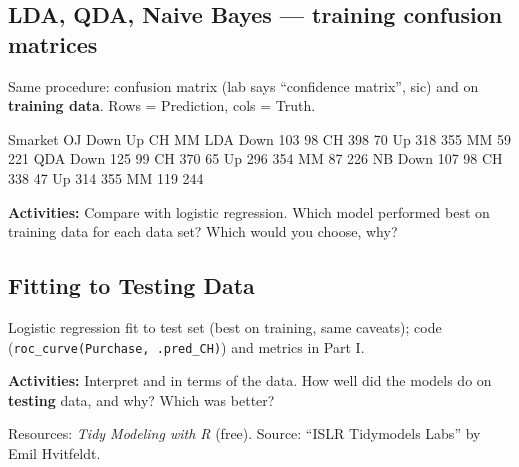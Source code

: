 \subsection{LDA, QDA, Naive Bayes --- training confusion matrices}
%
Same procedure: confusion matrix (lab says ``confidence matrix'', sic) and  on \textbf{training data}. Rows = Prediction, cols = Truth.
\begin{routput}
              Smarket          OJ
            Down   Up       CH   MM
LDA   Down   103   98   CH 398   70
      Up     318  355   MM  59  221
QDA   Down   125   99   CH 370   65
      Up     296  354   MM  87  226
NB    Down   107   98   CH 338   47
      Up     314  355   MM 119  244
\end{routput}
\textbf{Activities:} Compare  with logistic regression. Which model performed best on training data for each data set? Which would you choose, why?

\subsection{Fitting to Testing Data}
%
Logistic regression fit to  test set (best on training, same caveats); code (\texttt{roc\_curve(Purchase, .pred\_CH)}) and metrics in Part I.

\textbf{Activities:} Interpret  and  in terms of the data. How well did the models do on \textbf{testing} data, and why? Which was better?

Resources: \emph{Tidy Modeling with R} (free). Source: ``ISLR Tidymodels Labs'' by Emil Hvitfeldt.
